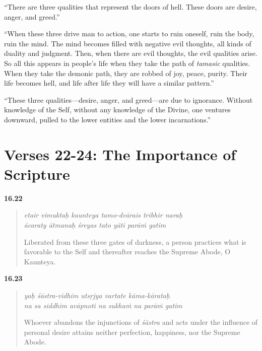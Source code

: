 \enquote{There are three qualities that represent the doors of hell. These doors are desire, anger, and greed.}

\enquote{When these three drive man to action, one starts to ruin oneself, ruin the body, ruin the mind. The mind becomes filled with negative evil thoughts, all kinds of duality and judgment. Then, when there are evil thoughts, the evil qualities arise. So all this appears in people’s life when they take the path of \textit{tamasic} qualities. When they take the demonic path, they are robbed of joy, peace, purity. Their life becomes hell, and life after life they will have a similar pattern.}

\enquote{These three qualities---desire, anger, and greed---are due to ignorance. Without knowledge of the Self, without any knowledge of the Divine, one ventures downward, pulled to the lower entities and the lower incarnations.}

\section{Verses 22-24: The Importance of Scripture}\label{sec-verses-22-24-the-importance-of-scripture}


\par\noindent\textbf{16.22}\par
\begin{verse}
\textit{etair vimuktaḥ kaunteya tamo-dvārais tribhir naraḥ} \\
\textit{ācaraty ātmanaḥ śreyas tato yāti parāṁ gatim}

\noindent Liberated from these three gates of darkness, a person practices what is favorable to the Self and thereafter reaches the Supreme Abode, O Kaunteya.
\end{verse}
\par



\par\noindent\textbf{16.23}\par
\begin{verse}
\textit{yaḥ śāstra-vidhim utsṛjya vartate kāma-kārataḥ} \\
\textit{na sa siddhim avāpnoti na sukhaṁ na parāṁ gatim}

\noindent Whoever abandons the injunctions of \textit{śāstra} and acts under the influence of personal desire attains neither perfection, happiness, nor the Supreme Abode.
\end{verse}
\par



